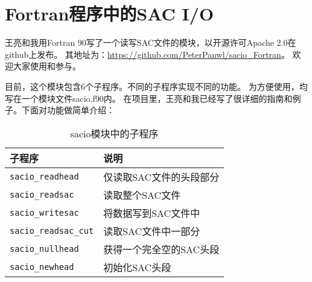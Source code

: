 \section{Fortran程序中的SAC I/O}
王亮和我用Fortran 90写了一个读写SAC文件的模块，以开源许可Apache 2.0在github上发布。
其地址为：\url{https://github.com/PeterPanwl/sacio_Fortran}。
欢迎大家使用和参与。

目前，这个模块包含6个子程序。不同的子程序实现不同的功能。
为方便使用，均写在一个模块文件sacio.f90内。
在项目里，王亮和我已经写了很详细的指南和例子。下面对功能做简单介绍：


\begin{table}[H]
\centering
\caption{sacio模块中的子程序}
\label{table:sacio_Fortran}
\begin{tabular}{ll}
\toprule
子程序      &   说明        \\
\midrule
\verb|sacio_readhead|      &   仅读取SAC文件的头段部分 \\
\verb|sacio_readsac|          &   读取整个SAC文件 \\
\verb|sacio_writesac|         &   将数据写到SAC文件中 \\
\verb|sacio_readsac_cut|         &   读取SAC文件中一部分 \\
\verb|sacio_nullhead|            &   获得一个完全空的SAC头段\\
\verb|sacio_newhead|            &   初始化SAC头段\\
\bottomrule
\end{tabular}
\end{table}
